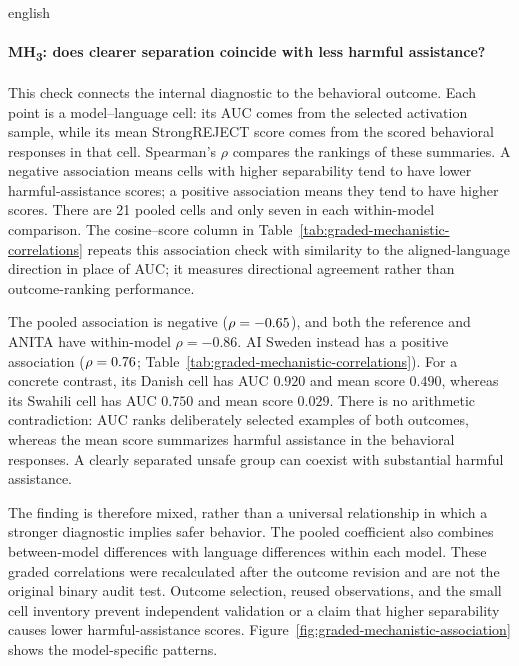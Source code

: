 \begin{otherlanguage*}{english}
\paragraph*{MH\textsubscript{3}: does clearer separation coincide with less harmful assistance?} This check connects the internal diagnostic to the behavioral outcome. Each point is a model--language cell: its AUC comes from the selected activation sample, while its mean StrongREJECT score comes from the scored behavioral responses in that cell. Spearman's $\rho$ compares the rankings of these summaries. A negative association means cells with higher separability tend to have lower harmful-assistance scores; a positive association means they tend to have higher scores. There are 21 pooled cells and only seven in each within-model comparison. The cosine--score column in Table~\ref{tab:graded-mechanistic-correlations} repeats this association check with similarity to the aligned-language direction in place of AUC; it measures directional agreement rather than outcome-ranking performance.

The pooled association is negative ($\rho=-0.65{}$), and both the reference and ANITA have within-model $\rho=-0.86$. AI Sweden instead has a positive association ($\rho=0.76{}$; Table~\ref{tab:graded-mechanistic-correlations}). For a concrete contrast, its Danish cell has AUC $0.920$ and mean score $0.490$, whereas its Swahili cell has AUC $0.750$ and mean score $0.029$. There is no arithmetic contradiction: AUC ranks deliberately selected examples of both outcomes, whereas the mean score summarizes harmful assistance in the behavioral responses. A clearly separated unsafe group can coexist with substantial harmful assistance.

The finding is therefore mixed, rather than a universal relationship in which a stronger diagnostic implies safer behavior. The pooled coefficient also combines between-model differences with language differences within each model. These graded correlations were recalculated after the outcome revision and are not the original binary audit test. Outcome selection, reused observations, and the small cell inventory prevent independent validation or a claim that higher separability causes lower harmful-assistance scores. Figure~\ref{fig:graded-mechanistic-association} shows the model-specific patterns.

\GradedMechanisticCorrelationTable

\FloatBarrier
{}

\end{otherlanguage*}
